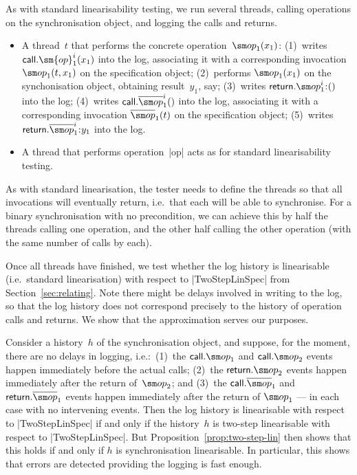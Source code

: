 As with standard linearisability testing, we run several threads, calling
operations on the synchronisation object, and logging the calls and returns. 
%
\begin{itemize}
\item A thread~$t$ that performs the concrete operation~$\op_1(x_1)$: (1)~writes
  $\call.\sm{op}_1^i(x_1)$ into the log, associating it with a corresponding
  invocation $\op_1(t, x_1)$ on the specification object; (2)~performs
  $\op_1(x_1)$ on the synchonisation object, obtaining result~$y_1$, say;
  (3)~writes $\return.\op_1^i \:: ()$ into the log; (4)~writes
  $\call.\overline{\op}_1^i()$ into the log, associating it with a
  corresponding invocation $\overline{\op}_1(t)$ on the specification object;
  (5)~writes $\return.\overline{\op}_1^i \:: y_1$ into the log.

\item A thread that performs operation~|op| acts as for standard
  linearisability testing.
\end{itemize}
%
%



As with standard linearisation, the tester needs to define the
threads so that all invocations will eventually return, i.e.~that each will be
able to synchronise.  For a binary synchronisation with no precondition, we
can achieve this by half the threads calling one operation, and the other half
calling the other operation (with the same number of calls by each).

Once all threads have finished, we test whether the log history is
linearisable (i.e.~standard linearisation) with respect to |TwoStepLinSpec|
from Section~\ref{sec:relating}.
%
Note there might be delays involved in writing to the log, so that the log
history does not correspond precisely to the history of operation calls and
returns.  We show that the approximation serves our purposes.


Consider a history~$h$ of the synchronisation object, and suppose, for the
moment, there are no delays in logging, i.e.:\ (1)~the $\call.\op_1$ and
$\call.\op_2$ events happen immediately before the actual calls; (2)~the
$\return.\op_2$ events happen immediately after the return of~$\op_2$; and
(3)~the $\call.\overline\op_1$ and $\return.\overline\op_1$ events happen
immediately after the return of $\op_1$ --- in each case with no intervening
events.  Then the log history is linearisable with respect to |TwoStepLinSpec|
if and only if the history~$h$ is two-step linearisable with respect to
|TwoStepLinSpec|.  But Proposition~\ref{prop:two-step-lin} then shows that
this holds if and only if $h$ is synchronisation linearisable.  In particular,
this shows that errors are detected providing the logging is fast enough.

